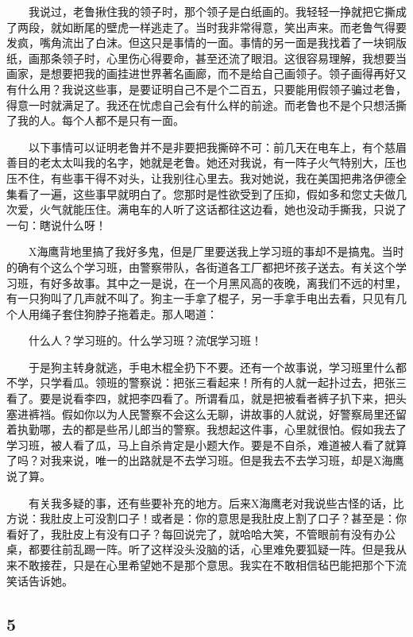　　我说过，老鲁揪住我的领子时，那个领子是白纸画的。我轻轻一挣就把它撕成了两段，就如断尾的壁虎一样逃走了。当时我非常得意，笑出声来。而老鲁气得要发疯，嘴角流出了白沫。但这只是事情的一面。事情的另一面是我找着了一块铜版纸，画那条领子时，心里伤心得要命，甚至还流了眼泪。这很容易理解，我想要当画家，是想要把我的画挂进世界著名画廊，而不是给自己画领子。领子画得再好又有什么用？我说这些事，是要证明自己不是个二百五，只要能用假领子骗过老鲁，得意一时就满足了。我还在忧虑自己会有什么样的前途。而老鲁也不是个只想活撕了我的人。每个人都不是只有一面。

　　以下事情可以证明老鲁并不是非要把我撕碎不可：前几天在电车上，有个慈眉善目的老太太叫我的名字，她就是老鲁。她还对我说，有一阵子火气特别大，压也压不住，有些事干得不对头，让我别往心里去。我对她说，我在美国把弗洛伊德全集看了一遍，这些事早就明白了。您那时是性欲受到了压抑，假如多和您丈夫做几次爱，火气就能压住。满电车的人听了这话都往这边看，她也没动手撕我，只说了一句：瞎说什么呀！ 

　　X海鹰背地里搞了我好多鬼，但是厂里要送我上学习班的事却不是搞鬼。当时的确有个这么个学习班，由警察带队，各街道各工厂都把坏孩子送去。有关这个学习班，有好多故事。其中之一是说，在一个月黑风高的夜晚，离我们不远的村里，有一只狗叫了几声就不叫了。狗主一手拿了棍子，另一手拿手电出去看，只见有几个人用绳子套住狗脖子拖着走。那人喝道： 

　　什么人？学习班的。什么学习班？流氓学习班！ 

　　于是狗主转身就逃，手电木棍全扔下不要。还有一个故事说，学习班里什么都不学，只学看瓜。领班的警察说：把张三看起来！所有的人就一起扑过去，把张三看了。要是说看李四，就把李四看了。所谓看瓜，就是把被看者裤子扒下来，把头塞进裤裆。假如你以为人民警察不会这么无聊，讲故事的人就说，好警察局里还留着执勤哪，去的都是些吊儿郎当的警察。我想起这件事，心里就很怕。假如我去了学习班，被人看了瓜，马上自杀肯定是小题大作。要是不自杀，难道被人看了就算了吗？对我来说，唯一的出路就是不去学习班。但是我去不去学习班，却是X海鹰说了算。

　　有关我多疑的事，还有些要补充的地方。后来X海鹰老对我说些古怪的话，比方说：我肚皮上可没割口子！或者是：你的意思是我肚皮上割了口子？甚至是：你看好了，我肚皮上有没有口子？每回说完了，就哈哈大笑，不管眼前有没有办公桌，都要往前乱踢一阵。听了这样没头没脑的话，心里难免要狐疑一阵。但是我从来不敢接茬，只是在心里希望她不是那个意思。我实在不敢相信毡巴能把那个下流笑话告诉她。

\subsection{5}

